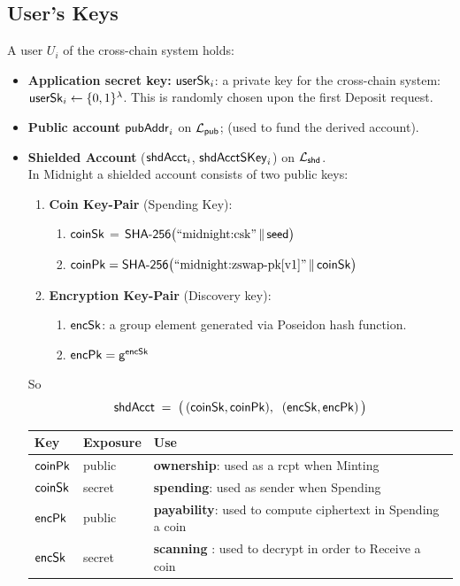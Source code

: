 \subsection{User's Keys}
\label{ssec:userskeys}
A user  $U_i$ of  the cross-chain system holds:
\begin{itemize}
    \item { \bf Application secret key:} $\mathsf{userSk}_i$: a private key for the cross-chain system: $\mathsf{userSk}_i\leftarrow\{0,1\}^{\lambda}$. This is randomly chosen upon the first Deposit request.
      \item \textbf{Public account }$\mathsf{pubAddr}_i$  on $\mathcal{L}_{\mathsf{pub}}$; (used to fund the derived account).
      \item \textbf{Shielded Account } ($\mathsf{shdAcct}_i$, $\mathsf{shdAcctSKey}_i$) on $\mathcal{L}_{\mathsf{shd}}$. \\
      In Midnight a shielded account consists of two public keys:
\begin{enumerate}
    \item \textbf{Coin Key-Pair} (Spending Key):
    \begin{enumerate}
        \item $\mathsf{coinSk}$ = $\mathsf{SHA\text{-}256}\bigl(\text{``midnight:csk''} \,\|\, \mathsf{seed}\bigr)$
        \item $\mathsf{coinPk} = \mathsf{SHA\text{-}256}\bigl(\text{``midnight:zswap-pk[v1]''} \,\|\, \mathsf{coinSk}\bigr)$
    \end{enumerate}

    \item \textbf{Encryption Key-Pair} (Discovery key):
    \begin{enumerate}
          \item $\mathsf{encSk}$: a group element generated via Poseidon hash function.
        \item $\mathsf{encPk} = \mathsf{g}^{\mathsf{encSk}}$
    \end{enumerate}
\end{enumerate}
\noindent So
\[
  \mathsf{shdAcct} \;=\; \bigl(\,(\mathsf{coinSk}, \mathsf{coinPk}),\;\; (\mathsf{encSk}, \mathsf{encPk})\,\bigr)
\]

\begin{center}
\begin{tabular}{@{}L{1.7cm}L{1.7cm}L{11.0cm}@{}}
\toprule
\textbf{Key} & \textbf{Exposure} & \textbf{Use} \\
\midrule
$\mathsf{coinPk}$ & public & \textbf{ownership}: used as a rcpt when Minting \\
$\mathsf{coinSk}$ & secret & \textbf{spending}:  used as sender when Spending \\
$\mathsf{encPk}$  & public & \textbf{payability}: used to compute ciphertext in Spending a coin\\
$\mathsf{encSk}$  & secret & \textbf{scanning} : used to decrypt in order to Receive a coin \\
\bottomrule
\end{tabular}
\end{center}
\end{itemize}


